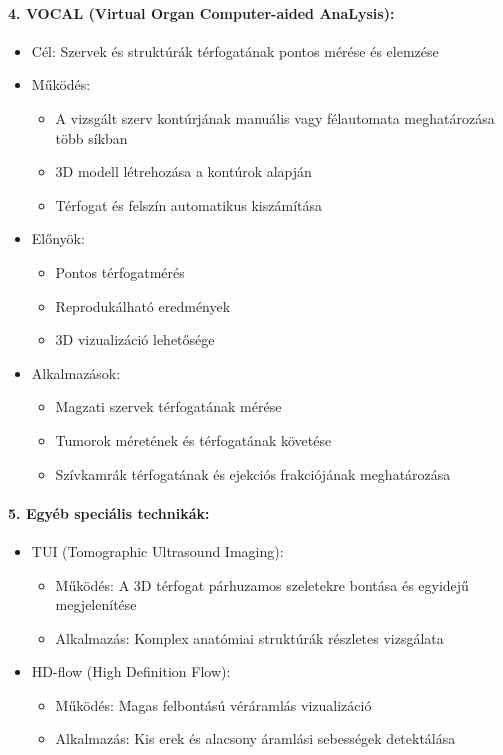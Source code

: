 \documentclass[a4paper,12pt]{article}
\begin{document}
\paragraph{4. VOCAL (Virtual Organ Computer-aided AnaLysis):} \begin{itemize} \item Cél: Szervek és struktúrák térfogatának pontos mérése és elemzése \item Működés: \begin{itemize} \item A vizsgált szerv kontúrjának manuális vagy félautomata meghatározása több síkban \item 3D modell létrehozása a kontúrok alapján \item Térfogat és felszín automatikus kiszámítása \end{itemize} \item Előnyök: \begin{itemize} \item Pontos térfogatmérés \item Reprodukálható eredmények \item 3D vizualizáció lehetősége \end{itemize} \item Alkalmazások: \begin{itemize} \item Magzati szervek térfogatának mérése \item Tumorok méretének és térfogatának követése \item Szívkamrák térfogatának és ejekciós frakciójának meghatározása \end{itemize} \end{itemize}

\paragraph{5. Egyéb speciális technikák:} \begin{itemize} \item TUI (Tomographic Ultrasound Imaging): \begin{itemize} \item Működés: A 3D térfogat párhuzamos szeletekre bontása és egyidejű megjelenítése \item Alkalmazás: Komplex anatómiai struktúrák részletes vizsgálata \end{itemize} \item HD-flow (High Definition Flow): \begin{itemize} \item Működés: Magas felbontású véráramlás vizualizáció \item Alkalmazás: Kis erek és alacsony áramlási sebességek detektálása \end{itemize} \end{itemize}
\end{document}
